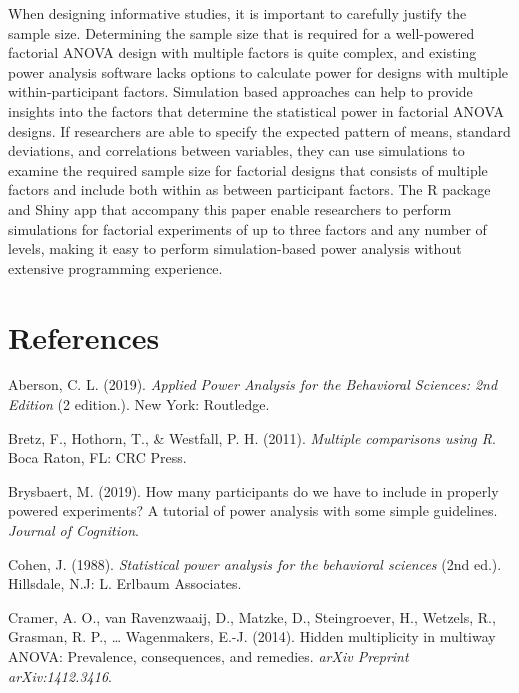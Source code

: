 \documentclass[,jou, draftfirst, a4paper,floatsintext]{apa6}
\begin{document}
When designing informative studies, it is important to carefully justify the sample size.
Determining the sample size that is required for a well-powered factorial ANOVA design with multiple factors is quite complex, and existing power analysis software lacks options to calculate power for designs with multiple within-participant factors.
Simulation based approaches can help to provide insights into the factors that determine the statistical power in factorial ANOVA designs.
If researchers are able to specify the expected pattern of means, standard deviations, and correlations between variables, they can use simulations to examine the required sample size for factorial designs that consists of multiple factors and include both within as between participant factors.
The R package and Shiny app that accompany this paper enable researchers to perform simulations for factorial experiments of up to three factors and any number of levels, making it easy to perform simulation-based power analysis without extensive programming experience.

\newpage

\hypertarget{references}{%
\section{References}\label{references}}

\setlength{\parindent}{-0.5in}
\setlength{\leftskip}{0.5in}

\hypertarget{refs}{}
\leavevmode\hypertarget{ref-aberson_applied_2019}{}%
Aberson, C. L. (2019). \emph{Applied Power Analysis for the Behavioral Sciences: 2nd Edition} (2 edition.). New York: Routledge.

\leavevmode\hypertarget{ref-bretz_multiple_2011}{}%
Bretz, F., Hothorn, T., \& Westfall, P. H. (2011). \emph{Multiple comparisons using R}. Boca Raton, FL: CRC Press.

\leavevmode\hypertarget{ref-brysbaert_how_2019}{}%
Brysbaert, M. (2019). How many participants do we have to include in properly powered experiments? A tutorial of power analysis with some simple guidelines. \emph{Journal of Cognition}.

\leavevmode\hypertarget{ref-cohen_statistical_1988}{}%
Cohen, J. (1988). \emph{Statistical power analysis for the behavioral sciences} (2nd ed.). Hillsdale, N.J: L. Erlbaum Associates.

\leavevmode\hypertarget{ref-cramer_hidden_2014}{}%
Cramer, A. O., van Ravenzwaaij, D., Matzke, D., Steingroever, H., Wetzels, R., Grasman, R. P., \ldots{} Wagenmakers, E.-J. (2014). Hidden multiplicity in multiway ANOVA: Prevalence, consequences, and remedies. \emph{arXiv Preprint arXiv:1412.3416}.
\end{document}
